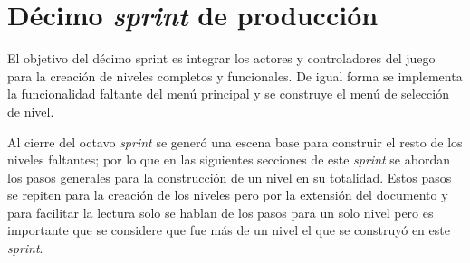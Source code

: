\section{Décimo \textit{sprint} de producción}
El objetivo del décimo sprint es integrar los actores y controladores del juego
para la creación de niveles completos y funcionales. De igual forma se
implementa la funcionalidad faltante del menú principal y se construye el menú
de selección de nivel.
\\
\par
Al cierre del octavo \textit{sprint} se generó una escena base para construir el
resto de los niveles faltantes; por lo que en las siguientes secciones de este
\textit{sprint} se abordan los pasos generales para la construcción de un nivel
en su totalidad. Estos pasos se repiten para la creación de los niveles pero por
la extensión del documento y para facilitar la lectura solo se hablan de los
pasos para un solo nivel pero es importante que se considere que fue más de un
nivel el que se construyó en este \textit{sprint}.
